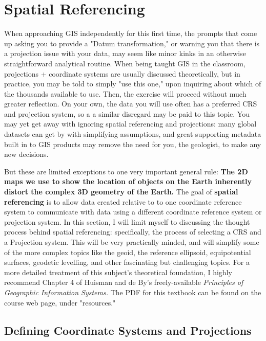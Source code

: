 \documentclass{article}
\begin{document}
\section{Spatial Referencing}

When approaching GIS independently for this first time, the prompts that come up asking you to provide a "Datum transformation," or warning you that there is a projection issue with your data, may seem like minor kinks in an otherwise straightforward analytical routine. When being taught GIS in the classroom, projections + coordinate systems are usually discussed theoretically, but in practice, you may be told to simply "use this one," upon inquiring about which of the thousands available to use. Then, the exercise will proceed without much greater reflection. On your own, the data you will use often has a preferred CRS and projection system, so a a similar disregard may be paid to this topic. You may yet get away with ignoring spatial referencing and projections: many global datasets can get by with simplifying assumptions, and great supporting metadata built in to GIS products may remove the need for you, the geologist, to make any new decisions. 

But these are limited exceptions to one very important general rule: \textbf{The 2D maps we use to show the location of objects on the Earth inherently distort the complex 3D geometry of the Earth.} The goal of \textbf{spatial referencing} is to allow data created relative to to one coordinate reference system to communicate with data using a different coordinate reference system or projection system. In this section, I will limit myself to discussing the thought process behind spatial referencing: specifically, the process of selecting a CRS and a Projection system. This will be very practically minded, and will simplify some of the more complex topics like the geoid, the reference ellipsoid, equipotential surfaces, geodetic levelling, and other fascinating but challenging topics.  For a more detailed treatment of this subject's theoretical foundation, I highly recommend Chapter 4 of Huisman and de By's freely-available \textit{Principles of Geographic Information Systems.} The PDF for this textbook can be found on the course web page, under "resources." 

\subsection{Defining Coordinate Systems and Projections}
\end{document}
